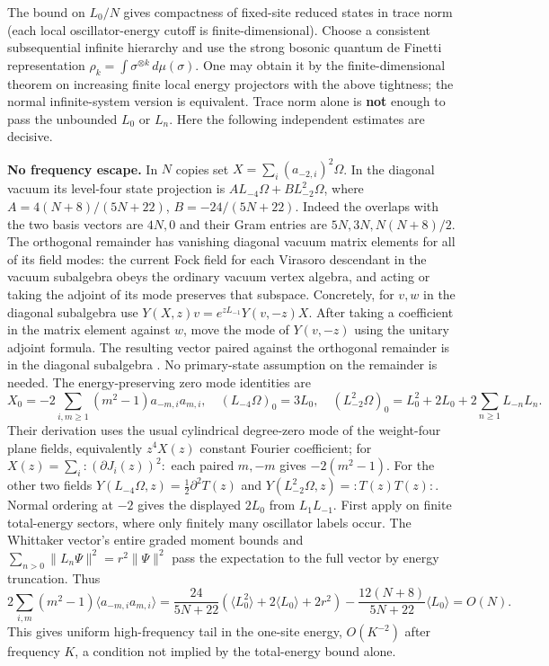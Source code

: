 \documentclass[11pt]{article}
\begin{document}
The bound on \(L_0/N\) gives compactness of fixed-site reduced states in trace norm (each local oscillator-energy cutoff is finite-dimensional). Choose a consistent subsequential infinite hierarchy and use the strong bosonic quantum de Finetti representation \cite{definetti} \(\rho_k=\int\sigma^{\otimes k}\,d\mu(\sigma)\). One may obtain it by the finite-dimensional theorem on increasing finite local energy projectors with the above tightness; the normal infinite-system version is equivalent. Trace norm alone is \textbf{not} enough to pass the unbounded \(L_0\) or \(L_n\). Here the following independent estimates are decisive.

\textbf{No frequency escape.} In \(N\) copies set \(X=\sum_i (a_{-2,i})^2\Omega\). In the diagonal vacuum its level-four state projection is \(A L_{-4}\Omega+B L_{-2}^2\Omega\), where \(A=4(N+8)/(5N+22)\), \(B=-24/(5N+22)\). Indeed the overlaps with the two basis vectors are \(4N,0\) and their Gram entries are \(5N,3N,N(N+8)/2\). The orthogonal remainder has vanishing diagonal vacuum matrix elements for all of its field modes: the current Fock field for each Virasoro descendant in the vacuum subalgebra obeys the ordinary vacuum vertex algebra, and acting or taking the adjoint of its mode preserves that subspace. Concretely, for \(v,w\) in the diagonal subalgebra use \(Y(X,z)v=e^{zL_{-1}}Y(v,-z)X\). After taking a coefficient in the matrix element against \(w\), move the mode of \(Y(v,-z)\) using the unitary adjoint formula. The resulting vector paired against the orthogonal remainder is in the diagonal subalgebra \cite{voa}. No primary-state assumption on the remainder is needed. The energy-preserving zero mode identities are \[
 X_0=-2\sum_{i,m\ge1}(m^2-1)a_{-m,i}a_{m,i},\quad
 (L_{-4}\Omega)_0=3L_0,\quad
 (L_{-2}^2\Omega)_0=L_0^2+2L_0+2\sum_{n\ge1}L_{-n}L_n .
\] Their derivation uses the usual cylindrical degree-zero mode of the weight-four plane fields, equivalently \(z^4 X(z)\) constant Fourier coefficient; for \(X(z)=\sum_i:(\partial J_i(z))^2:\) each paired \(m,-m\) gives \(-2(m^2-1)\). For the other two fields \(Y(L_{-4}\Omega,z)=\frac12\partial^2 T(z)\) and \(Y(L_{-2}^2\Omega,z)=:T(z)T(z):\). Normal ordering at \(-2\) gives the displayed \(2L_0\) from \(L_1L_{-1}\). First apply on finite total-energy sectors, where only finitely many oscillator labels occur. The Whittaker vector's entire graded moment bounds and \(\sum_{n>0}\|L_n\Psi\|^2=r^2\|\Psi\|^2\) pass the expectation to the full vector by energy truncation. Thus \[
 2\sum_{i,m}(m^2-1)\langle a_{-m,i}a_{m,i}\rangle
   =\frac{24}{5N+22}(\langle L_0^2\rangle+2\langle L_0\rangle+2r^2)
       -\frac{12(N+8)}{5N+22}\langle L_0\rangle=O(N).
\] This gives uniform high-frequency tail in the one-site energy, \(O(K^{-2})\) after frequency \(K\), a condition not implied by the total-energy bound alone.
\end{document}

